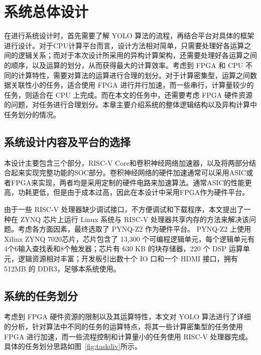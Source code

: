 \chapter{系统总体设计}\label{chap:overal}

在进行系统设计时，首先需要了解 YOLO 算法的流程，再结合平台对具体的框架进行设计。对于CPU计算平台而言，设计方法相对简单，只需要处理好各运算之间的逻辑关系；而对于本次设计所采用的异构计算架构，还需要处理好各运算之间的顺序，以及运算的划分，从而获得最大的计算效率。考虑到 FPGA 和 CPU 不同的计算特性，需要对算法的运算进行合理的划分。对于计算密集型，运算之间数据关联性小的任务，适合使用 FPGA 进行并行加速，而一些串行，计算量较少的任务，则适合在 CPU 上完成。而在本文的任务中，还需要考虑 FPGA 硬件资源的问题，对任务进行合理划分。本章主要介绍系统的整体逻辑结构以及异构计算中任务划分的情况。

\section{系统设计内容及平台的选择}

本设计主要包含三个部分，RISC-V Core和卷积神经网络加速器，以及将两部分结合起来实现完整功能的SOC部分。卷积神经网络的硬件加速通常可以采用ASIC或者FPGA来实现，两者均是采用定制的硬件电路来加速算法。通常ASIC的性能更高，功耗更低，但是由于成本过高，因此在本设计中采用FPGA作为硬件平台。

由于一些 RISC-V 处理器缺少调试接口，不方便调试和下载程序，本文提出了一种在 ZYNQ 芯片上运行 Linux 系统与 RISC-V 处理器共享内存的方法来解决该问题。考虑各方面因素，最终选取了 PYNQ-Z2 作为硬件平台。 PYNQ-Z2 上使用Xilinx ZYNQ 7020芯片，芯片包含了 13,300 个可编程逻辑单元，每个逻辑单元有4个6输入查找表和8个触发器；芯片有 630 KB 的块存储器，220 个 DSP 运算单元，逻辑资源相对丰富；开发板引出数十个 IO 口和一个 HDMI 接口，拥有 512MB 的 DDR3，足够本系统使用。

\section{系统的任务划分}


考虑到 FPGA 硬件资源的限制以及其运算特性，本文对 YOLO 算法进行了详细的分析，针对算法中不同的任务的运算特点，将其一些计算密集型的任务使用 FPGA 进行加速，而一些流程控制和计算量小的任务使用 RISC-V 处理器完成。具体的任务划分思路如图~\ref{fig:taskdiv}所示。

